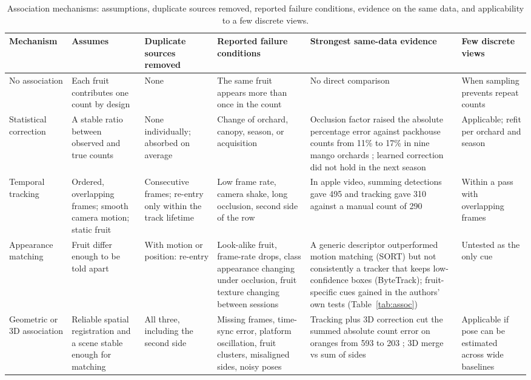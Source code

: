 \begin{table}[!t]
\centering
\caption{Association mechanisms: assumptions, duplicate sources removed, reported failure conditions, evidence on the same data, and applicability to a few discrete views.}\label{tab:mechsyn}
\footnotesize
\begin{tabularx}{\textwidth}{@{}L{2.0cm}L{2.9cm}L{2.2cm}YL{3.0cm}L{2.3cm}@{}}
\toprule
Mechanism & Assumes & Duplicate sources removed & Reported failure conditions & Strongest same-data evidence & Few discrete views\\
\midrule
No association & Each fruit contributes one count by design & None & The same fruit appears more than once in the count & No direct comparison & When sampling prevents repeat counts\\
Statistical correction & A stable ratio between observed and true counts & None individually; absorbed on average & Change of orchard, canopy, season, or acquisition \citep{anderson2021estimation,koirala2021attempting,islam2022ground} & Occlusion factor raised the absolute percentage error against packhouse counts from 11\% to 17\% in nine mango orchards \citep{anderson2021estimation}; learned correction did not hold in the next season \citep{koirala2021attempting} & Applicable; refit per orchard and season\\
Temporal tracking & Ordered, overlapping frames; smooth camera motion; static fruit & Consecutive frames; re-entry only within the track lifetime & Low frame rate, camera shake, long occlusion, second side of the row \citep{qi2025assessment,wei2025multi,saraceni2024agrisort,wang2019mango} & In apple video, summing detections gave 495 and tracking gave 310 against a manual count of 290 \citep{hu2023fruit} & Within a pass with overlapping frames\\
Appearance matching & Fruit differ enough to be told apart & With motion or position: re-entry & Look-alike fruit, frame-rate drops, class appearance changing under occlusion, fruit texture changing between sessions \citep{genemola2023video,qi2025assessment,kirk2021robust,mirbod2021field} & A generic descriptor outperformed motion matching (SORT) but not consistently a tracker that keeps low-confidence boxes (ByteTrack); fruit-specific cues gained in the authors' own tests (Table~\ref{tab:assoc}) & Untested as the only cue\\
Geometric or 3D association & Reliable spatial registration and a scene stable enough for matching & All three, including the second side & Missing frames, time-sync error, platform oscillation, fruit clusters, misaligned sides, noisy poses \citep{stein2016image,genemola2020fruitb,qureshi2023seeing,meyer2025fruitnerf} & Tracking plus 3D correction cut the summed absolute count error on oranges from 593 to 203 \citep{liu2018robust}; 3D merge vs sum of sides \citep{hani2020comparative} & Applicable if pose can be estimated across wide baselines\\

\end{tabularx}
\end{table}
